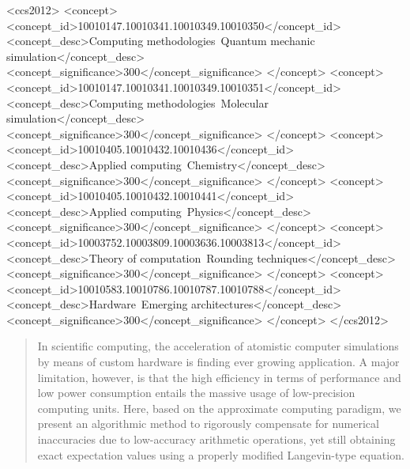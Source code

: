 \documentclass[format=acmsmall,authorversion,nonacm,timestamp,urlbreakonhyphens]{acmart}
\begin{document}



\begin{CCSXML}
<ccs2012>
<concept>
<concept_id>10010147.10010341.10010349.10010350</concept_id>
<concept_desc>Computing methodologies~Quantum mechanic simulation</concept_desc>
<concept_significance>300</concept_significance>
</concept>
<concept>
<concept_id>10010147.10010341.10010349.10010351</concept_id>
<concept_desc>Computing methodologies~Molecular simulation</concept_desc>
<concept_significance>300</concept_significance>
</concept>
<concept>
<concept_id>10010405.10010432.10010436</concept_id>
<concept_desc>Applied computing~Chemistry</concept_desc>
<concept_significance>300</concept_significance>
</concept>
<concept>
<concept_id>10010405.10010432.10010441</concept_id>
<concept_desc>Applied computing~Physics</concept_desc>
<concept_significance>300</concept_significance>
</concept>
<concept>
<concept_id>10003752.10003809.10003636.10003813</concept_id>
<concept_desc>Theory of computation~Rounding techniques</concept_desc>
<concept_significance>300</concept_significance>
</concept>
<concept>
<concept_id>10010583.10010786.10010787.10010788</concept_id>
<concept_desc>Hardware~Emerging architectures</concept_desc>
<concept_significance>300</concept_significance>
</concept>
</ccs2012>
\end{CCSXML}




\begin{abstract}
In scientific computing, the acceleration of atomistic computer simulations by means of custom hardware is finding ever growing application.
A major limitation, however, is that the high efficiency in terms of performance and low power consumption entails the massive usage of low-precision computing units. Here, based on the approximate computing paradigm, we present an algorithmic method to rigorously compensate for numerical inaccuracies due to low-accuracy arithmetic operations, yet still obtaining exact expectation values using a properly modified Langevin-type equation.
\end{abstract}
\end{document}
